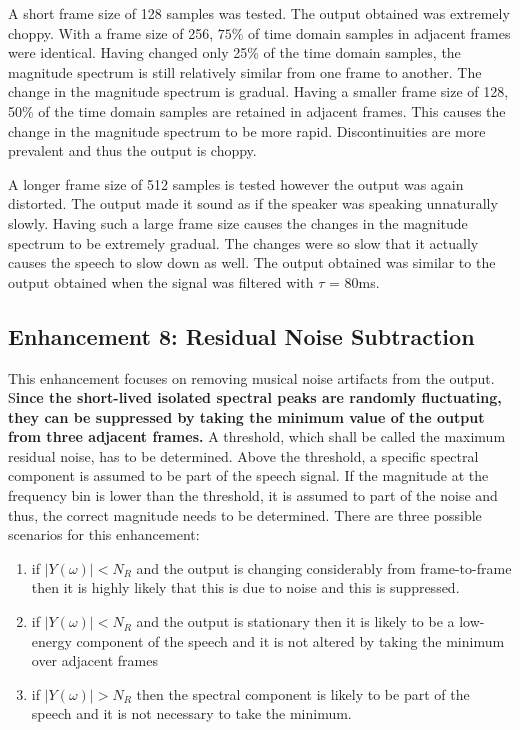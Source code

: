 \documentclass[a4paper,pra,twocolumn,10pt,aps,longbibliography,nobalancelastpage]{revtex4-1}
\begin{document}
A short frame size of 128 samples was tested. The output obtained was extremely choppy. With a frame size of 256, $75\%$ of time domain samples in adjacent frames were identical. Having changed only 25\% of the time domain samples, the magnitude spectrum is still relatively similar from one frame to another. The change in the magnitude spectrum is gradual. Having a smaller frame size of 128, 50\% of the time domain samples are retained in adjacent frames. This causes the change in the magnitude spectrum to be more rapid. Discontinuities are more prevalent and thus the output is choppy. 

A longer frame size of 512 samples is tested however the output was again distorted. The output made it sound as if the speaker was speaking unnaturally slowly. Having such a large frame size causes the changes in the magnitude spectrum to be extremely gradual. The changes were so slow that it actually causes the speech to slow down as well. The output obtained was similar to the output obtained when the signal was filtered with $\tau$ = 80ms.

\subsection{Enhancement 8: Residual Noise Subtraction}

This enhancement focuses on removing musical noise artifacts from the output. S\textbf{ince the short-lived isolated spectral peaks are randomly fluctuating, they can be suppressed by taking the minimum value of the output from three adjacent frames.} A threshold, which shall be called the maximum residual noise, has to be determined. Above the threshold, a specific spectral component is assumed to be part of the speech signal. If the magnitude at the frequency bin is lower than the threshold, it is assumed to part of the noise and thus, the correct magnitude needs to be determined. There are three possible scenarios for this enhancement:
\begin{enumerate}
    \item if $|Y(\omega)| < N_R$ and the output is changing considerably from frame-to-frame then it is highly likely that this is due to noise and this is suppressed.
    \item if $|Y(\omega)| < N_R$ and the output is stationary then it is likely to be a low-energy component of the speech and it is not altered by taking the minimum over adjacent frames
    \item if $|Y(\omega)| > N_R$ then the spectral component is likely to be part of the speech and it is not necessary to take the minimum.
\end{enumerate}
\end{document}
